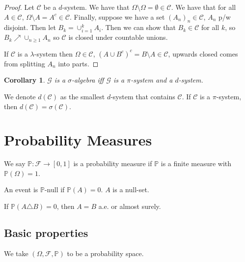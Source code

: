 \documentclass{article}
\newtheorem{corollary}[theorem]{Corollary}
\theoremstyle{definition}
\numberwithin{theorem}{section}
\numberwithin{equation}{section}
\begin{document}
\begin{proof}
	Let $\mathcal{C}$ be a $d$-system. We have that $\Omega \setminus \Omega = \emptyset \in \mathcal{C}$. We have that for all $A \in \mathcal{C}$, $\Omega \setminus A = A^c \in \mathcal{C}$. Finally, suppose we have a set $(A_n)_n \in \mathcal{C}$, $A_n$ p/w disjoint. Then let $B_k = \cup_{i = 1}^{k} A_i$. Then we can show that $B_k \in \mathcal{C}$ for all $k$, so $B_k \nearrow \cup_{n \geq 1} A_n$ so $\mathcal{C}$ is closed under countable unions. 
	
	If $\mathcal{C}$ is a $\lambda$-system then $\Omega \in \mathcal{C}$, $(A \cup B^c)^c = B \setminus A \in \mathcal{C}$, upwards closed comes from splitting $A_n$ into parts. 
\end{proof}

\begin{corollary}
	$\mathcal{G}$ is a $\sigma$-algebra iff $\mathcal{G}$ is a $\pi$-system and a $d$-system.  
\end{corollary}

We denote $d(\mathcal{C})$ as the smallest $d$-system that contains $\mathcal{C}$. If $\mathcal{C}$ is a $\pi$-system, then $d(\mathcal{C}) = \sigma(\mathcal{C})$.

\section{Probability Measures}
We say $\mathbb{P}: \mathcal{F} \rightarrow [0, 1]$ is a probability measure if $\mathbb{P}$ is a finite measure with $\mathbb{P}(\Omega) = 1$. 

An event is $\mathbb{P}$-null if $\mathbb{P}(A) = 0$. $A$ is a null-set. 

If $\mathbb{P}(A \triangle B) = 0$, then $A = B$ a.e. or almost surely.

\subsection{Basic properties}
We take $(\Omega, \mathcal{F}, \mathbb{P})$ to be a probability space.
\end{document}

